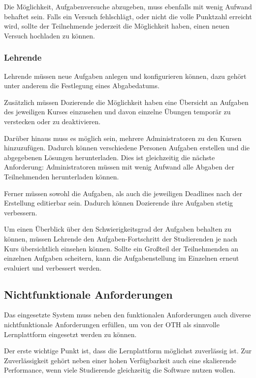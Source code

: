 Die Möglichkeit, Aufgabenversuche abzugeben, muss ebenfalls mit wenig Aufwand
behaftet sein. Falls ein Versuch fehlschlägt, oder nicht die volle Punktzahl
erreicht wird, sollte der Teilnehmende jederzeit die Möglichkeit haben, einen
neuen Versuch hochladen zu können.

\subsubsection{Lehrende}\label{anforderungsanalyse-funktional-lehrende}
Lehrende müssen neue Aufgaben anlegen und konfigurieren können, dazu gehört
unter anderem die Festlegung eines Abgabedatums.

Zusätzlich müssen Dozierende die Möglichkeit haben eine Übersicht an Aufgaben
des jeweiligen Kurses einzusehen und davon einzelne Übungen temporär zu
verstecken oder zu deaktivieren.

Darüber hinaus muss es möglich sein, mehrere Administratoren zu den Kursen
hinzuzufügen. Dadurch können verschiedene Personen Aufgaben erstellen und die
abgegebenen Lösungen herunterladen. Dies ist gleichzeitig die nächste
Anforderung: Administratoren müssen mit wenig Aufwand alle Abgaben der
Teilnehmenden herunterladen können.

Ferner müssen sowohl die Aufgaben, als auch die jeweiligen Deadlines nach der
Erstellung editierbar sein. Dadurch können Dozierende ihre Aufgaben stetig
verbessern.

Um einen Überblick über den Schwierigkeitsgrad der Aufgaben behalten zu können,
müssen Lehrende den Aufgaben-Fortschritt der Studierenden je nach Kurs
übersichtlich einsehen können. Sollte ein Großteil der Teilnehmenden an
einzelnen Aufgaben scheitern, kann die Aufgabenstellung im Einzelnen erneut
evaluiert und verbessert werden.

\subsection{Nichtfunktionale Anforderungen}
\label{anforderungsanalyse-nichtfunktional}
Das eingesetzte System muss neben den funktionalen Anforderungen auch diverse
nichtfunktionale Anforderungen erfüllen, um von der OTH als sinnvolle
Lernplattform eingesetzt werden zu können.

Der erste wichtige Punkt ist, dass die Lernplattform möglichst zuverlässig ist.
Zur Zuverlässigkeit gehört neben einer hohen Verfügbarkeit auch eine skalierende
Performance, wenn viele Studierende gleichzeitig die Software nutzen wollen.

